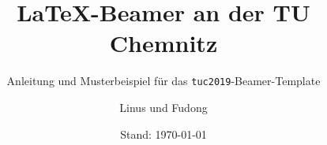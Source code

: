 
\usepackage{ifxetex}
\usepackage{ifluatex}
\ifxetex
\usepackage[nbabelshorthands]{polyglossia}
\setmainlanguage{german}
\else\ifluatex
\usepackage[babelshorthands]{polyglossia}
\setmainlanguage{german}
\else
\usepackage[T1]{fontenc}
\usepackage[utf8]{inputenc}
\usepackage[ngerman]{babel}
\usepackage{listingsutf8}
\fi\fi
\usepackage{url}
\usepackage{tikz}
\usepackage{amsmath}
\usepackage{exscale}
\usepackage{listings}
\usepackage{textcomp}
\usepackage{chemfig}
\usepackage{metalogo}
\usepackage{tabularx}
\usepackage{framed}
\graphicspath{ {./bilder} }


\def\UrlBreaks{\do\:\do\.\do\@\do\\\do\/\do\!\do\_\do\|\do\;\do\>\do\]%
 \do\)\do\,\do\?\do\'\do+\do\=\do\#}
\def\UrlBigBreaks{}



\title{\LaTeX-Beamer an der TU Chemnitz}
\subtitle[Anleitung und Musterbeispiel]{Anleitung und Musterbeispiel für das \texttt{tuc2019}-Beamer-Template}
\author{Linus und Fudong}
\date[\today]{Stand: \today}



